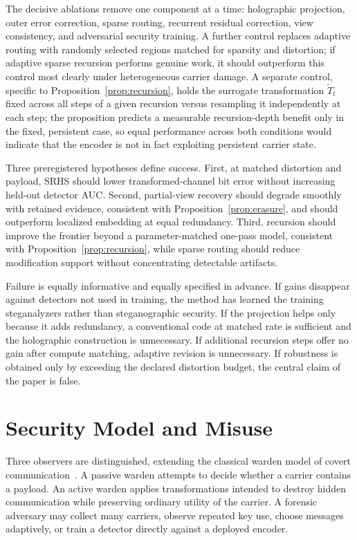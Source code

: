 \documentclass[11pt]{article}
\begin{document}
The decisive ablations remove one component at a time: holographic projection, outer error correction, sparse routing, recurrent residual correction, view consistency, and adversarial security training. A further control replaces adaptive routing with randomly selected regions matched for sparsity and distortion; if adaptive sparse recursion performs genuine work, it should outperform this control most clearly under heterogeneous carrier damage. A separate control, specific to Proposition~\ref{prop:recursion}, holds the surrogate transformation $\widetilde T_t$ fixed across all steps of a given recursion versus resampling it independently at each step; the proposition predicts a measurable recursion-depth benefit only in the fixed, persistent case, so equal performance across both conditions would indicate that the encoder is not in fact exploiting persistent carrier state.

Three preregistered hypotheses define success. First, at matched distortion and payload, SRHS should lower transformed-channel bit error without increasing held-out detector AUC. Second, partial-view recovery should degrade smoothly with retained evidence, consistent with Proposition~\ref{prop:erasure}, and should outperform localized embedding at equal redundancy. Third, recursion should improve the frontier beyond a parameter-matched one-pass model, consistent with Proposition~\ref{prop:recursion}, while sparse routing should reduce modification support without concentrating detectable artifacts.

Failure is equally informative and equally specified in advance. If gains disappear against detectors not used in training, the method has learned the training steganalyzers rather than steganographic security. If the projection helps only because it adds redundancy, a conventional code at matched rate is sufficient and the holographic construction is unnecessary. If additional recursion steps offer no gain after compute matching, adaptive revision is unnecessary. If robustness is obtained only by exceeding the declared distortion budget, the central claim of the paper is false.

\section{Security Model and Misuse}

Three observers are distinguished, extending the classical warden model of covert communication~\cite{simmons1984}. A passive warden attempts to decide whether a carrier contains a payload. An active warden applies transformations intended to destroy hidden communication while preserving ordinary utility of the carrier. A forensic adversary may collect many carriers, observe repeated key use, choose messages adaptively, or train a detector directly against a deployed encoder.
\end{document}
